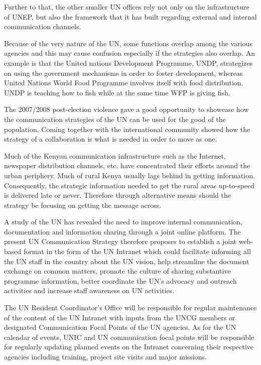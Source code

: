 \documentclass[12pt]{article}
\begin{document}
Further to that, the other smaller UN offices rely not only on the infrastructure of UNEP, but also the framework that it has built regarding external and internal communication channels.

Because of the very nature of the UN, some functions overlap among the various agencies and this may cause confusion especially if the strategies also overlap. An example is that the United nations Development Programme, UNDP, strategizes on using the government mechanisms in order to foster development, whereas United Nations World Food Programme involves itself with food distribution. UNDP is teaching how to fish while at the same time WFP is giving fish.

The 2007/2008 post-election violence gave a good opportunity to showcase how the communication strategies of the UN can be used for the good of the population. Coming together with the international community showed how the strategy of a collaboration is what is needed in order to move as one.

Much of the Kenyan communication infrastructure such as the Internet, newspaper distribution channels, etc. have concentrated their efforts around the urban periphery. Much of rural Kenya usually lags behind in getting information. Consequently, the strategic information needed to get the rural areas up-to-speed is delivered late or never. Therefore through alternative means should the strategy be focusing on getting the message across.

A study of the UN has revealed the need to improve internal communication, documentation and information sharing through a joint online platform. The present UN Communication Strategy therefore proposes to establish a joint web-based format in the form of the UN Intranet which could facilitate informing all the UN staff in the country about the UN vision, help streamline the document exchange on common matters, promote the culture of sharing substantive programme information, better coordinate the UN’s advocacy and  outreach activities and increase staff awareness on UN activities.

The UN Resident Coordinator’s Office will be responsible for regular maintenance of the content of the UN Intranet with inputs from the UNCG members or designated Communication Focal Points of the UN agencies. As for the UN calendar of events, UNIC and UN communication focal points will be responsible for regularly updating planned events on the Intranet concerning their respective agencies including training, project site visits and major missions.
\end{document}
